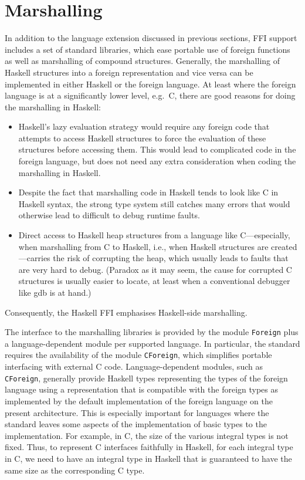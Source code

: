 \documentclass[a4paper,twosides]{article}
\newcommand{\code}[1]{\texttt{#1}}      %
\begin{document}
\newpage
\section{Marshalling}
\label{sec:marshalling}

In addition to the language extension discussed in previous sections, FFI
support includes a set of standard libraries, which ease portable use of
foreign functions as well as marshalling of compound structures.  Generally,
the marshalling of Haskell structures into a foreign representation and vice
versa can be implemented in either Haskell or the foreign language.  At least
where the foreign language is at a significantly lower level, e.g.\ C, there
are good reasons for doing the marshalling in Haskell:
%
\begin{itemize}
\item Haskell's lazy evaluation strategy would require any foreign code that
  attempts to access Haskell structures to force the evaluation of these
  structures before accessing them. This would lead to complicated code in the
  foreign language, but does not need any extra consideration when coding the
  marshalling in Haskell.
\item Despite the fact that marshalling code in Haskell tends to look like C
  in Haskell syntax, the strong type system still catches many errors that
  would otherwise lead to difficult to debug runtime faults.
\item Direct access to Haskell heap structures from a language like
  C---especially, when marshalling from C to Haskell, i.e., when Haskell
  structures are created---carries the risk of corrupting the heap, which
  usually leads to faults that are very hard to debug. (Paradox as it may
  seem, the cause for corrupted C structures is usually easier to locate, at
  least when a conventional debugger like gdb is at hand.)
\end{itemize}
%
Consequently, the Haskell FFI emphasises Haskell-side marshalling.

The interface to the marshalling libraries is provided by the module
\code{Foreign} plus a language-dependent module per supported language.  In
particular, the standard requires the availability of the module
\code{CForeign}, which simplifies portable interfacing with external C code.
Language-dependent modules, such as \code{CForeign}, generally provide Haskell
types representing the types of the foreign language using a representation
that is compatible with the foreign types as implemented by the default
implementation of the foreign language on the present architecture.  This is
especially important for languages where the standard leaves some aspects of
the implementation of basic types to the implementation.  For example, in C,
the size of the various integral types is not fixed.  Thus, to represent C
interfaces faithfully in Haskell, for each integral type in C, we need to have
an integral type in Haskell that is guaranteed to have the same size as the
corresponding C type.
\end{document}
